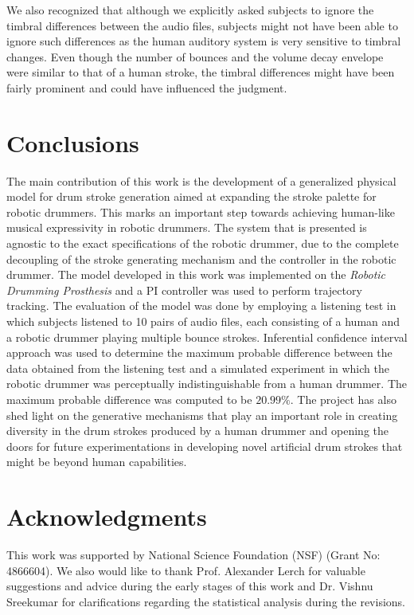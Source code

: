 \documentclass[final,1p,times]{elsarticle}
\begin{document}
We also recognized
that although we explicitly asked subjects to ignore the timbral differences
between the audio files, subjects might not have been able to ignore such
differences as the human auditory system is very sensitive to timbral changes.
Even though the number of bounces and the volume decay envelope were
similar to that of a human stroke, the timbral differences might have been
fairly prominent and could have influenced the judgment.

\section{Conclusions}
The main contribution of this work is the development of a generalized physical model for drum stroke generation aimed at expanding the stroke palette for robotic drummers. This marks an important step towards achieving human-like musical expressivity in robotic drummers. The system that is presented is agnostic to the exact specifications of the robotic drummer, due to the complete decoupling of the stroke generating mechanism and the controller in the robotic drummer. 
The model developed in this work was implemented on the \textit{Robotic Drumming Prosthesis} and a PI controller was used to perform trajectory tracking. The evaluation of the model was done by employing a listening test in which subjects listened to 10 pairs of audio files, each consisting of a human and a robotic drummer playing multiple bounce strokes. Inferential confidence interval approach was used to determine the maximum probable difference between the data obtained from the listening test and a simulated experiment in which the robotic drummer was perceptually indistinguishable from a human drummer. The maximum probable difference was computed to be $20.99\%$. The project has also shed light on the generative mechanisms that play an important role in creating diversity in the drum strokes produced by a human drummer and opening the doors for future experimentations in developing novel artificial drum strokes that might be beyond human capabilities.
\section*{Acknowledgments}
This work was supported by National Science Foundation (NSF) (Grant No: 4866604). We also would like to thank Prof. Alexander Lerch for valuable suggestions and advice during the early stages of this work and Dr. Vishnu Sreekumar for clarifications regarding the statistical analysis during the revisions. 
\end{document}
